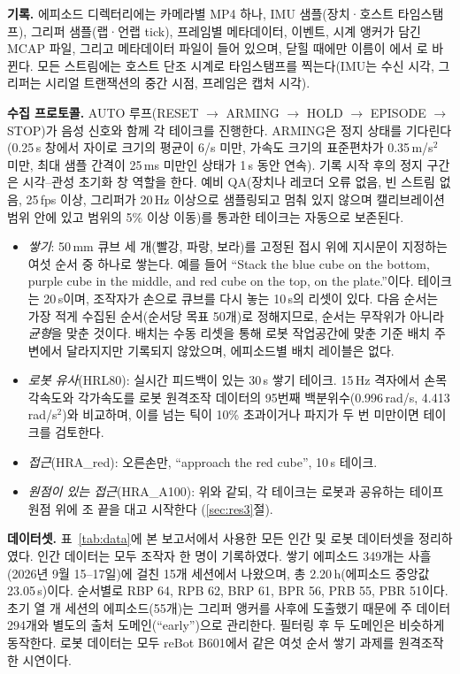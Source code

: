 \documentclass[conference,10pt]{IEEEtran}
\newcommand{\mm}{\,mm\xspace}
\begin{document}
\textbf{기록.} 에피소드 디렉터리에는 카메라별 MP4 하나, IMU 샘플(장치·호스트 타임스탬프), 그리퍼 샘플(랩·언랩 tick), 프레임별
메타데이터, 이벤트, 시계 앵커가 담긴 MCAP 파일, 그리고 메타데이터 파일이 들어 있으며, 닫힐 때에만 이름이 에서
로 바뀐다. 모든 스트림에는 호스트 단조 시계로 타임스탬프를 찍는다(IMU는 수신 시각, 그리퍼는 시리얼 트랜잭션의 중간
시점, 프레임은 캡처 시각).

\textbf{수집 프로토콜.} AUTO 루프(RESET $\to$ ARMING $\to$ HOLD $\to$ EPISODE $\to$ STOP)가 음성 신호와 함께 각 테이크를 진행한다.
ARMING은 정지 상태를 기다린다(0.25\,s 창에서 자이로 크기의 평균이 6\textdegree/s 미만, 가속도 크기의 표준편차가 0.35\,m/s$^2$ 미만,
최대 샘플 간격이 25\,ms 미만인 상태가 1\,s 동안 연속). 기록 시작 후의 정지 구간은 시각--관성 초기화 창 역할을 한다. 예비 QA(장치나
레코더 오류 없음, 빈 스트림 없음, 25\,fps 이상, 그리퍼가 20\,Hz 이상으로 샘플링되고 멈춰 있지 않으며 캘리브레이션 범위 안에 있고
범위의 5\% 이상 이동)를 통과한 테이크는 자동으로 보존된다.
\begin{itemize}
\item \emph{쌓기}: 50\mm{} 큐브 세 개(빨강, 파랑, 보라)를 고정된 접시 위에 지시문이 지정하는 여섯 순서 중 하나로 쌓는다. 예를 들어
``Stack the blue cube on the bottom, purple cube in the middle, and red cube on the top, on the plate.''이다. 테이크는 20\,s이며,
조작자가 손으로 큐브를 다시 놓는 10\,s의 리셋이 있다. 다음 순서는 가장 적게 수집된 순서(순서당 목표 50개)로 정해지므로, 순서는
무작위가 아니라 \emph{균형}을 맞춘 것이다. 배치는 수동 리셋을 통해 로봇 작업공간에 맞춘 기준 배치 주변에서 달라지지만 기록되지
않았으며, 에피소드별 배치 레이블은 없다.
\item \emph{로봇 유사}(HRL80): 실시간 피드백이 있는 30\,s 쌓기 테이크. 15\,Hz 격자에서 손목 각속도와 각가속도를 로봇 원격조작 데이터의
95번째 백분위수(0.996\,rad/s, 4.413\,rad/s$^2$)와 비교하며, 이를 넘는 틱이 10\% 초과이거나 파지가 두 번 미만이면 테이크를 검토한다.
\item \emph{접근}(HRA\_red): 오른손만, ``approach the red cube'', 10\,s 테이크.
\item \emph{원점이 있는 접근}(HRA\_A100): 위와 같되, 각 테이크는 로봇과 공유하는 테이프 원점 위에 조 끝을 대고 시작한다
(\ref{sec:res3}절).
\end{itemize}

\textbf{데이터셋.} 표~\ref{tab:data}에 본 보고서에서 사용한 모든 인간 및 로봇 데이터셋을 정리하였다. 인간 데이터는 모두 조작자 한 명이
기록하였다. 쌓기 에피소드 349개는 사흘(2026년 9월 15--17일)에 걸친 15개 세션에서 나왔으며, 총 2.20\,h(에피소드 중앙값 23.05\,s)이다.
순서별로 RBP 64, RPB 62, BRP 61, BPR 56, PRB 55, PBR 51이다. 초기 열 개 세션의 에피소드(55개)는 그리퍼 앵커를 사후에 도출했기 때문에
주 데이터 294개와 별도의 출처 도메인(``early'')으로 관리한다. 필터링 후 두 도메인은 비슷하게 동작한다. 로봇 데이터는 모두 reBot
B601에서 같은 여섯 순서 쌓기 과제를 원격조작한 시연이다.
\end{document}
